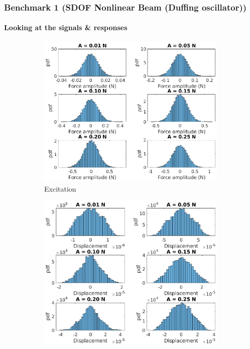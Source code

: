 \documentclass[aspectratio=169]{beamer}
\begin{document}
\begin{frame}[allowframebreaks]
  \frametitle{Benchmark 1 (SDOF Nonlinear Beam (Duffing oscillator))}
  \framesubtitle{Looking at the signals \& responses}
  \begin{figure}
    \centering
    \begin{subfigure}{0.33\linewidth}
      \includegraphics[width=\linewidth]{../../../benchmark1/fig/Excitation_Hists}
      \caption{Excitation}
    \end{subfigure}%
    \begin{subfigure}{0.33\linewidth}
      \includegraphics[width=\linewidth]{../../../benchmark1/fig/Response_Hists}

\end{subfigure}
\end{figure}
\end{frame}
\end{document}
